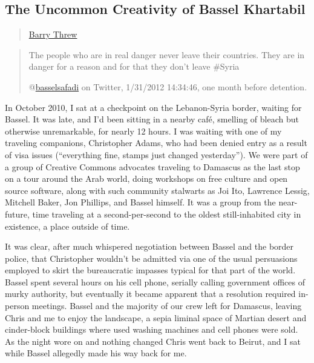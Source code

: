\subsection{The Uncommon Creativity of Bassel
Khartabil}\label{the-uncommon-creativity-of-bassel-khartabil}

\begin{quote}
\hyperlink{barry-threw}{Barry Threw}
\end{quote}

\begin{quote}
The people who are in real danger never leave their countries. They are
in danger for a reason and for that they don't leave \#Syria

@\href{https://twitter.com/basselsafadi/status/164355948582932480}{basselsafadi}
on Twitter, 1/31/2012 14:34:46, one month before detention.
\end{quote}

In October 2010, I sat at a checkpoint on the Lebanon-Syria border,
waiting for Bassel. It was late, and I'd been sitting in a nearby café,
smelling of bleach but otherwise unremarkable, for nearly 12 hours. I
was waiting with one of my traveling companions, Christopher Adams, who
had been denied entry as a result of visa issues (``everything fine,
stamps just changed yesterday''). We were part of a group of Creative
Commons advocates traveling to Damascus as the last stop on a tour
around the Arab world, doing workshops on free culture and open source
software, along with such community stalwarts as Joi Ito, Lawrence
Lessig, Mitchell Baker, Jon Phillips, and Bassel himself. It was a group
from the near-future, time traveling at a second-per-second to the
oldest still-inhabited city in existence, a place outside of time.

It was clear, after much whispered negotiation between Bassel and the
border police, that Christopher wouldn't be admitted via one of the
usual persuasions employed to skirt the bureaucratic impasses typical
for that part of the world. Bassel spent several hours on his cell
phone, serially calling government offices of murky authority, but
eventually it became apparent that a resolution required in-person
meetings. Bassel and the majority of our crew left for Damascus, leaving
Chris and me to enjoy the landscape, a sepia liminal space of Martian
desert and cinder-block buildings where used washing machines and cell
phones were sold. As the night wore on and nothing changed Chris went
back to Beirut, and I sat while Bassel allegedly made his way back for
me.


